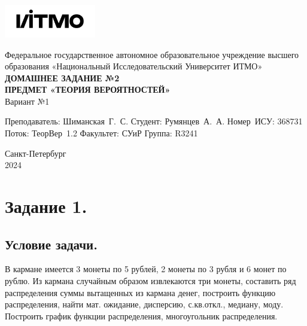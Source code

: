 \documentclass[a4paper, 12pt]{article}
\begin{document}
    \begin{titlepage}

        \begin{center}
        \includegraphics[width=0.3\textwidth]{itmo.png} %
        \vfill

        Федеральное государственное автономное образовательное учреждение высшего образования
        «Национальный Исследовательский Университет ИТМО»\\

        \vfill
        {\large\bf ДОМАШНЕЕ ЗАДАНИЕ №2}\\
        {\large\bf ПРЕДМЕТ «ТЕОРИЯ ВЕРОЯТНОСТЕЙ»}\\
        Вариант №1
        \vfill

        \begin{flushright}
            \begin{minipage}{.45\textwidth}
            {
                \hbox{Преподаватель:}
                \hbox{Шиманская Г. С.}
                \hbox{Студент:}
                \hbox{Румянцев А. А.}
                \hbox{}
                \hbox{Номер ИСУ:}
                \hbox{368731}
                \hbox{Поток:}
                \hbox{ТеорВер 1.2}
                \hbox{Факультет:}
                \hbox{СУиР}
                \hbox{Группа:}
                \hbox{R3241}
            }
            \end{minipage}
        \end{flushright}

        \vfill

        Санкт-Петербург\\
        2024
        \end{center}
    \end{titlepage}

    \tableofcontents

    \newpage
    \section{Задание 1.}
    \subsection{Условие задачи.}
    В кармане имеется 3 монеты по 5 рублей, 2 монеты по 3 рубля и 6 монет 
    по рублю. Из кармана случайным образом извлекаются три монеты, 
    составить ряд распределения суммы вытащенных из кармана денег, 
    построить функцию распределения, найти мат. ожидание, дисперсию, 
    с.кв.откл., медиану, моду. Построить график функции распределения, 
    многоугольник распределения.
\end{document}
